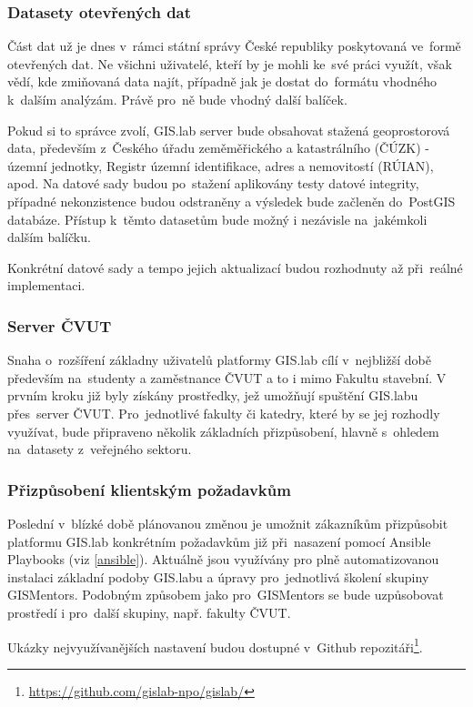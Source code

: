 \subsubsection{Datasety otevřených dat}

Část dat už je dnes v~rámci státní správy České republiky poskytovaná ve~formě 
otevřených dat. \cite{data-gov} Ne všichni uživatelé, kteří by je mohli ke~své 
práci využít, však vědí, kde zmiňovaná
data najít, případně jak je dostat do~formátu vhodného k~dalším
analýzám. Právě pro~ně bude vhodný další balíček.

Pokud si to správce zvolí, GIS.lab server bude obsahovat stažená
geoprostorová data, především z~Českého úřadu zeměměřického a
katastrálního (ČÚZK) - územní jednotky, Registr územní identifikace,
adres a nemovitostí (RÚIAN), apod. Na datové sady budou po~stažení
aplikovány testy datové integrity, případné nekonzistence budou
odstraněny a výsledek bude začleněn do~PostGIS databáze. Přístup 
k~těmto datasetům bude možný i nezávisle na~jakémkoli dalším balíčku.

Konkrétní datové sady a tempo jejich aktualizací budou rozhodnuty až
při~reálné implementaci.

\subsubsection{Server ČVUT}
Snaha o~rozšíření základny uživatelů platformy GIS.lab cílí v~nejbližší 
době především na~studenty a zaměstnance ČVUT a to i mimo Fakultu
stavební. V prvním kroku již byly získány prostředky, jež umožňují
spuštění GIS.labu přes~server ČVUT. Pro~jednotlivé fakulty či katedry,
které by se jej rozhodly využívat, bude připraveno několik základních
přizpůsobení, hlavně s~ohledem na~datasety z~veřejného sektoru.

\subsubsection{Přizpůsobení klientským požadavkům}
Poslední v~blízké době plánovanou změnou je umožnit zákazníkům
přizpůsobit platformu GIS.lab konkrétním požadavkům již při~nasazení
pomocí Ansible Playbooks (viz \ref{ansible}). Aktuálně jsou využívány
pro plně automatizovanou instalaci základní podoby GIS.labu a úpravy
pro~jednotlivá školení skupiny GISMentors. Podobným způsobem jako pro~GISMentors 
se bude uzpůsobovat prostředí i pro~další skupiny,
např. fakulty ČVUT.

Ukázky nejvyužívanějších nastavení budou dostupné v~Github
repozitáři\footnote{\href{https://github.com/gislab-npo/gislab/}{https://github.com/gislab-npo/gislab/}}.

